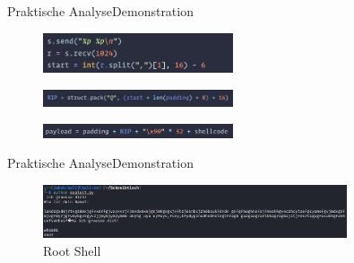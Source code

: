 \begin{frame}{Praktische Analyse}{Demonstration}
    \begin{figure}[h]
        \centering
        \includegraphics[width=0.5\textwidth,height=0.75\textheight,keepaspectratio]{images/format.png}
    \end{figure}
    \begin{figure}[h]
        \centering
        \includegraphics[width=0.5\textwidth,height=0.75\textheight,keepaspectratio]{images/rip.png}
    \end{figure}
    \begin{figure}[h]
        \centering
        \includegraphics[width=0.5\textwidth,height=0.75\textheight,keepaspectratio]{images/payload.png}
    \end{figure}
\end{frame}

\begin{frame}{Praktische Analyse}{Demonstration}
    \begin{figure}[h]
        \centering
        \includegraphics[width=0.8\textwidth,height=0.75\textheight,keepaspectratio]{images/root.png}
        \caption{Root Shell}
    \end{figure}
\end{frame}

